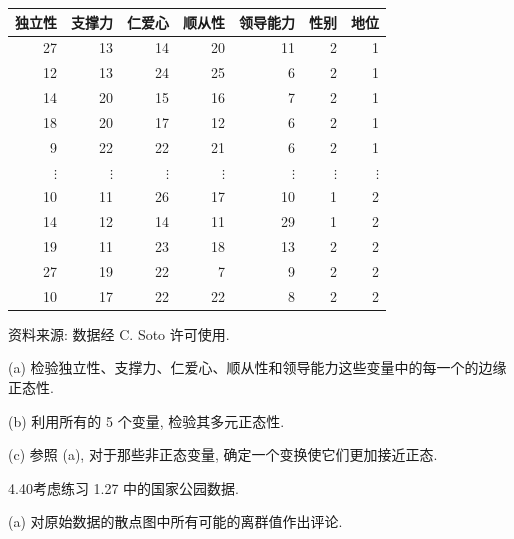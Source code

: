 \begin{mvtable}
\label{tab:4.6}
\begin{tabular}{rrrrrrr}
\toprule
独立性&支撑力&仁爱心&顺从性&领导能力&性别&地位\\
\midrule
27&13&14&20&11&2&1\\
12&13&24&25&6&2&1\\
14&20&15&16&7&2&1\\
18&20&17&12&6&2&1\\
9&22&22&21&6&2&1\\
$\vdots$&$\vdots$&$\vdots$&$\vdots$&$\vdots$&$\vdots$&$\vdots$\\
10&11&26&17&10&1&2\\
14&12&14&11&29&1&2\\
19&11&23&18&13&2&2\\
27&19&22&7&9&2&2\\
10&17&22&22&8&2&2\\
\bottomrule
\end{tabular}

\vspace{2pt}
{资料来源: 数据经 C. Soto 许可使用.}
\end{mvtable}

(a) 检验独立性、支撑力、仁爱心、顺从性和领导能力这些变量中的每一个的边缘正态性.

(b) 利用所有的 5 个变量, 检验其多元正态性.

(c) 参照 (a), 对于那些非正态变量, 确定一个变换使它们更加接近正态.

4.40\quad 考虑练习 1.27 中的国家公园数据.

(a) 对原始数据的散点图中所有可能的离群值作出评论.
